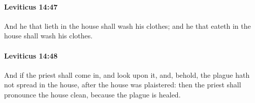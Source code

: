 		\paragraph{Leviticus 14:47} %
			\label{LEVITICUS-14-47}

			And he that lieth in the house shall wash his clothes; and he that eateth in the house shall wash his clothes.


		\paragraph{Leviticus 14:48} %
			\label{LEVITICUS-14-48}

			And if the priest shall come in, and look upon it, and, behold, the plague hath not spread in the house, after the house was plaistered: then the priest shall pronounce the house clean, because the plague is healed.


